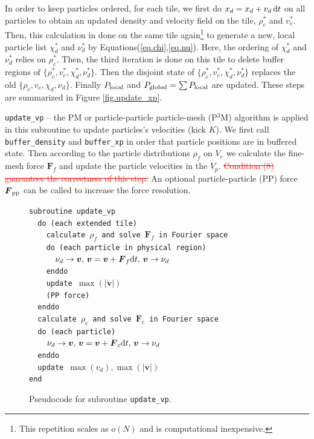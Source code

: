 \documentclass[10pt,twocolumn,preprint]{emulateapj}
\newcommand{\bs}{\boldsymbol}
\newcommand{\tcr}{\textcolor{red}}
\begin{document}
In order to keep particles ordered, for each tile, we first do $x_d=x_d+v_d\,{\rm d}t$ on all particles to obtain an updated density and velocity field on the tile,  $\rho_c^*$ and $v_c^*$. Then, this calculation in done on the same tile again\footnote{This repetition scales as $o(N)$ and is computational inexpensive.} to generate a new, local particle list $\chi_d^*$ and $\nu_d^*$ by Equations(\ref{eq.chi},\ref{eq.nu}). Here, the ordering of  $\chi_d^*$ and $\nu_d^*$ relies on  $\rho_c^*$. Then, the third iteration is done on this tile to delete buffer regions of  $\{\rho_c^*,v_c^*,\chi_d^*,\nu_d^*\}$.  Then the disjoint state of $\{\rho_c^*,v_c^*,\chi_d^*,\nu_d^*\}$ replaces the old $\{\rho_c,v_c,\chi_d,\nu_d\}$. Finally $P_{\rm local}$ and $P_{\rm global}=\sum P_{\rm local}$ are updated. These steps are summarized in Figure \ref{fig.update_xp}.

{\tt update\_vp} --
the PM or particle-particle particle-mesh (P$^3$M) algorithm is applied in this subroutine to update particles's velocities (kick $K$).
We first call {\tt buffer\_density} and {\tt buffer\_xp} in order that particle positions are in buffered state. Then according to the particle distributions $\rho_f$ on $V_e$ we calculate the fine-mesh force ${\bs F}_f$ and update the particle velocities in the $V_p$. \tcr{\sout{Condition (8) guarantees the correctness of this step.}}  An optional particle-particle (PP) force ${\bs F}_{\rm pp}$ can be called to increase the force resolution.

\begin{figure}[t]
{\tt subroutine update\_vp\\
\indent \ \ do (each extended tile)\\
\indent \ \ \ \ calculate $\rho_f$ and solve ${\bs F}_f$ in Fourier space\\
\indent \ \ \ \ do (each particle in physical region)\\
\indent \ \ \ \ \ \ $\nu_d\rightarrow{\bs v},\,{\bs v}={\bs v}+{\bs F}_f{\rm d}t,\, {\bs v}\rightarrow\nu_d$\\
\indent \ \ \ \ enddo\\
\indent \ \ \ \ update $\max(|{\dot{\bs v}}|)$\\
\indent \ \ \ \ (PP force)\\
\indent \ \ enddo\\
\indent \ \ calculate $\rho_c$ and solve ${\bs F}_c$ in Fourier space\\
\indent \ \ do (each particle)\\
\indent \ \ \ \ $\nu_d\rightarrow{\bs v},\,{\bs v}={\bs v}+{\bs F}_c{\rm d}t,\, {\bs v}\rightarrow\nu_d$\\
\indent \ \ enddo\\
\indent \ \ update $\max(v_d),\max(|{\dot{\bs v}}|)$\\
end\\}
\caption{Pseudocode for subroutine {\tt update\_vp}.}
\label{fig.update_vp}
\end{figure}
\end{document}

